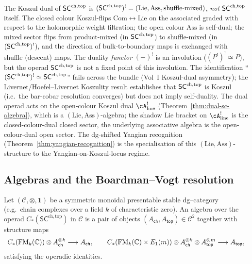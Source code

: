 \begin{remark}
\label{rem:sc-not-self-dual-operadic-guard}%
%
%
The Koszul dual of $\mathsf{SC}^{\mathrm{ch},\mathrm{top}}$ is
$(\mathsf{SC}^{\mathrm{ch},\mathrm{top}})^! = (\mathrm{Lie}, \mathrm{Ass}, \text{shuffle-mixed})$,
\emph{not} $\mathsf{SC}^{\mathrm{ch},\mathrm{top}}$ itself. The closed colour Koszul-flips
$\mathrm{Com} \leftrightarrow \mathrm{Lie}$ on the associated
graded with respect to the holomorphic weight filtration; the
open colour $\mathrm{Ass}$ is self-dual; the mixed sector flips
from product-mixed (in $\mathsf{SC}^{\mathrm{ch},\mathrm{top}}$) to shuffle-mixed (in
$(\mathsf{SC}^{\mathrm{ch},\mathrm{top}})^!$), and the direction of bulk-to-boundary
maps is exchanged with shuffle (descent) maps. The duality
\emph{functor} $(-)^!$ is an involution
($(P^!)^! \simeq P$), but the operad $\mathsf{SC}^{\mathrm{ch},\mathrm{top}}$ is not a fixed
point of this involution. The identification
``$(\mathsf{SC}^{\mathrm{ch},\mathrm{top}})^! \simeq \mathsf{SC}^{\mathrm{ch},\mathrm{top}}$'' fails across the bundle
(Vol~I Koszul-dual asymmetry); the Livernet/Hoefel--Livernet
Koszulity result establishes that $\mathsf{SC}^{\mathrm{ch},\mathrm{top}}$ is Koszul (i.e.\
the bar-cobar resolution converges) but does not imply
self-duality. The dual operad acts on the open-colour Koszul
dual $\cA^!_{\mathrm{line}}$
(Theorem~\textup{\ref*{thm:dual-sc-algebra}}), which is a
$(\mathrm{Lie}, \mathrm{Ass})$-algebra; the shadow Lie bracket on
$\cA^!_{\mathrm{line}}$ is the closed-colour-dual closed sector,
the underlying associative algebra is the open-colour-dual
open sector. The dg-shifted Yangian recognition
(Theorem~\textup{\ref{thm:yangian-recognition}}) is the
specialisation of this $(\mathrm{Lie}, \mathrm{Ass})$-structure
to the Yangian-on-Koszul-locus regime.
\end{remark}

\subsection{Algebras and the Boardman--Vogt resolution}
\label{subsec:WSC-algebras}

\begin{definition}[Algebras over $\mathsf{SC}^{\mathrm{ch,top}}$]
\label{def:SC-algebra}
Let $(\mathcal C,\otimes,\mathbf 1)$ be a symmetric monoidal presentable stable dg--category
(e.g.\ chain complexes over a field $k$ of characteristic zero). An algebra over the operad
$C_\ast(\mathsf{SC}^{\mathrm{ch,top}})$ in $\mathcal C$ is a pair of objects
$(A_{\mathsf{ch}},A_{\mathsf{top}})\in\mathcal C^2$
together with structure maps
\[
 C_\ast(\mathrm{FM}_k(\mathbb C))\otimes A_{\mathsf{ch}}^{\otimes k}\longrightarrow A_{\mathsf{ch}} ,
 \qquad
 C_\ast(\mathrm{FM}_k(\mathbb C)\times E_1(m))\otimes
 A_{\mathsf{ch}}^{\otimes k}\otimes A_{\mathsf{top}}^{\otimes m}\longrightarrow A_{\mathsf{top}} ,
\]
satisfying the operadic identities.
\end{definition}

